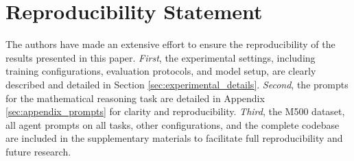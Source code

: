 \section{Reproducibility Statement}
The authors have made an extensive effort to ensure the reproducibility of the results presented in this paper. \textit{First}, the experimental settings, including training configurations, evaluation protocols, and model setup, are clearly described and detailed in Section \ref{sec:experimental_details}. \textit{Second}, the prompts for the mathematical reasoning task are detailed in Appendix \ref{sec:appendix_prompts} for clarity and reproducibility. \textit{Third}, the M500 dataset, all agent prompts on all tasks, other configurations, and the complete codebase are included in the supplementary materials to facilitate full reproducibility and future research.